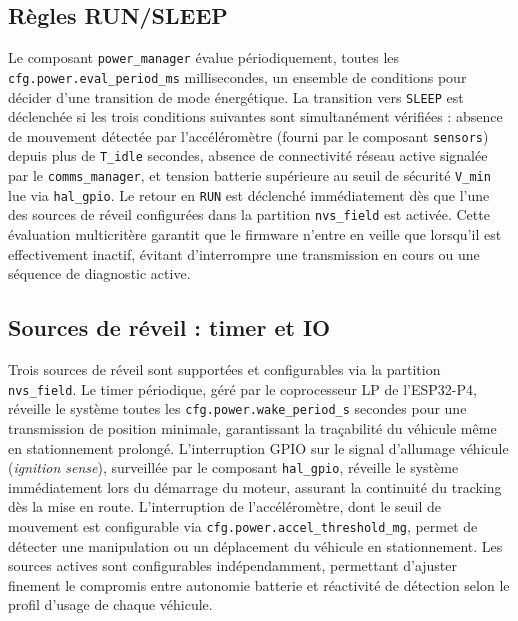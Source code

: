 \subsection{Règles RUN/SLEEP}
\label{subsec:power_rules}

Le composant \texttt{power\_manager} évalue périodiquement, toutes
les \texttt{cfg.power.eval\_period\_ms} millisecondes, un ensemble
de conditions pour décider d'une transition de mode énergétique.
La transition vers \texttt{SLEEP} est déclenchée si les trois
conditions suivantes sont simultanément vérifiées : absence de
mouvement détectée par l'accéléromètre (fourni par le composant
\texttt{sensors}) depuis plus de \texttt{T\_idle} secondes, absence
de connectivité réseau active signalée par le \texttt{comms\_manager},
et tension batterie supérieure au seuil de sécurité \texttt{V\_min}
lue via \texttt{hal\_gpio}. Le retour en \texttt{RUN} est déclenché
immédiatement dès que l'une des sources de réveil configurées dans
la partition \texttt{nvs\_field} est activée. Cette évaluation
multicritère garantit que le firmware n'entre en veille que lorsqu'il
est effectivement inactif, évitant d'interrompre une transmission
en cours ou une séquence de diagnostic active.

\subsection{Sources de réveil : timer et IO}
\label{subsec:power_wake}

Trois sources de réveil sont supportées et configurables via la
partition \texttt{nvs\_field}. Le timer périodique, géré par le
coprocesseur LP de l'ESP32-P4, réveille le système toutes les
\texttt{cfg.power.wake\_period\_s} secondes pour une transmission
de position minimale, garantissant la traçabilité du véhicule même
en stationnement prolongé. L'interruption GPIO sur le signal
d'allumage véhicule (\textit{ignition sense}), surveillée par le
composant \texttt{hal\_gpio}, réveille le système immédiatement lors
du démarrage du moteur, assurant la continuité du tracking dès la
mise en route. L'interruption de l'accéléromètre, dont le seuil de
mouvement est configurable via \texttt{cfg.power.accel\_threshold\_mg},
permet de détecter une manipulation ou un déplacement du véhicule
en stationnement. Les sources actives sont configurables
indépendamment, permettant d'ajuster finement le compromis entre
autonomie batterie et réactivité de détection selon le profil d'usage
de chaque véhicule.

